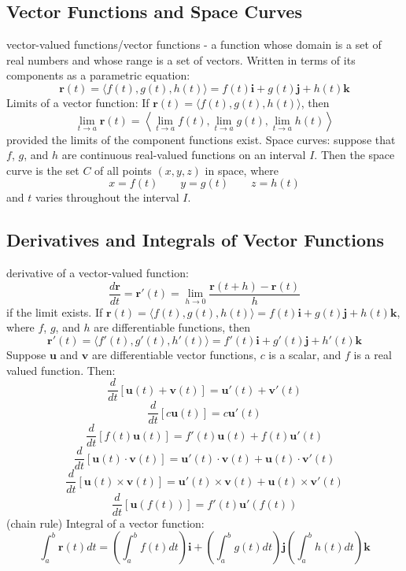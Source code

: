 \documentclass{article}
\begin{document}
    \subsection{Vector Functions and Space Curves} %
    \begin{outline}
        \1 vector-valued functions/vector functions - a function whose domain is a set of real numbers and whose range is a set of vectors. Written in terms of its components as a parametric equation: \[\mathbf r(t)=\langle f(t),g(t),h(t)\rangle=f(t)\mathbf i+g(t)\mathbf j+h(t)\mathbf k\]
        \1 Limits of a vector function: If \(\mathbf r(t)=\langle f(t),g(t),h(t)\rangle\), then \[\lim_{t\to a}\mathbf r(t)=\left\langle\lim_{t\to a}f(t),\lim_{t\to a}g(t),\lim_{t\to a}h(t)\right\rangle\] provided the limits of the component functions exist. 
        \1 Space curves: suppose that $f$, $g$, and $h$ are continuous real-valued functions on an interval $I$. Then the space curve is the set $C$ of all points \((x,y,z)\) in space, where \[x=f(t)\qquad y=g(t)\qquad z=h(t)\] and $t$ varies throughout the interval $I$. 
    \end{outline}
    \subsection{Derivatives and Integrals of Vector Functions}
    \begin{outline}
        \1 derivative of a vector-valued function: \[\dfrac{d\mathbf r}{dt}=\mathbf r'(t)=\lim_{h\to 0}\dfrac{\mathbf r(t+h)-\mathbf r(t)}{h}\] if the limit exists. 
        \1 If \(\mathbf r(t)=\langle f(t),g(t),h(t)\rangle=f(t)\mathbf i+g(t)\mathbf j+h(t)\mathbf k\), where $f$, $g$, and $h$ are differentiable functions, then \[\mathbf r'(t)=\langle f'(t),g'(t),h'(t)\rangle =f'(t)\mathbf i+g'(t)\mathbf j+h'(t)\mathbf k\]
        \1 Suppose $\mathbf u$ and $\mathbf v$ are differentiable vector functions, $c$ is a scalar, and $f$ is a real valued function. Then: 
            \2 \[\dfrac{d}{dt}[\mathbf u(t)+\mathbf v(t)]=\mathbf u'(t)+\mathbf v'(t)\]
            \2 \[\dfrac{d}{dt}[c\mathbf u(t)]=c\mathbf u'(t)\]
            \2 \[\dfrac{d}{dt}[f(t)\mathbf u(t)]=f'(t)\mathbf u(t)+f(t)\mathbf u'(t)\]
            \2 \[\dfrac{d}{dt}[\mathbf u(t)\cdot\mathbf v(t)]=\mathbf u'(t)\cdot\mathbf v(t)+\mathbf u(t)\cdot\mathbf v'(t)\]
            \2 \[\dfrac{d}{dt}[\mathbf u(t)\times\mathbf v(t)]=\mathbf u'(t)\times\mathbf v(t)+\mathbf u(t)\times\mathbf v'(t)\]
            \2 \[\dfrac{d}{dt}[\mathbf u(f(t))]=f'(t)\mathbf u'(f(t))\] (chain rule)
        \1 Integral of a vector function: \[\int^b_a\mathbf r(t)dt=\left(\int^b_af(t)dt\right)\mathbf i+\left(\int^b_ag(t)dt\right)\mathbf j\left(\int^b_ah(t)dt\right)\mathbf k\]
        
    \end{outline}
\end{document}
